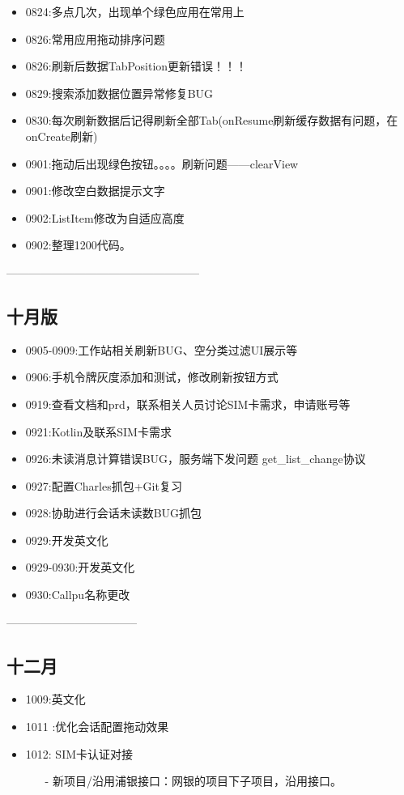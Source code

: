 \documentclass{ctexart}
\begin{document}
\begin{itemize}
		\item 0824:多点几次，出现单个绿色应用在常用上
		\item 0826:常用应用拖动排序问题
		\item 0826:刷新后数据TabPosition更新错误！！！
		\item 0829:搜索添加数据位置异常修复BUG
		\item 0830:每次刷新数据后记得刷新全部Tab(onResume刷新缓存数据有问题，在onCreate刷新)
		\item 0901:拖动后出现绿色按钮。。。。刷新问题——clearView
		\item 0901:修改空白数据提示文字
		\item 0902:ListItem修改为自适应高度
		
		\item 0902:整理1200代码。
	\end{itemize}
	—————————————————
	\newpage
	\subsection{十月版}
	\begin{itemize}
		\item 0905-0909:工作站相关刷新BUG、空分类过滤UI展示等
		\item 0906:手机令牌灰度添加和测试，修改刷新按钮方式
		\item 0919:查看文档和prd，联系相关人员讨论SIM卡需求，申请账号等
		\item 0921:Kotlin及联系SIM卡需求
		\item 0926:未读消息计算错误BUG，服务端下发问题
		\newline get\_list\_change协议
		\item 0927:配置Charles抓包+Git复习
		\item 0928:协助进行会话未读数BUG抓包
		\item 0929:开发英文化
		\item 0929-0930:开发英文化
		\item 0930:Callpu名称更改
		
	\end{itemize}
	-----------------------------------
	\newpage
	\subsection{十二月}
	\begin{itemize}
		\item 1009:英文化
		\item 1011 :优化会话配置拖动效果
		\item 1012: SIM卡认证对接
		\begin{itemize}
			\item[-] 新项目/沿用浦银接口：网银的项目下子项目，沿用接口。
		\end{itemize}
	\end{itemize}
\end{document}
